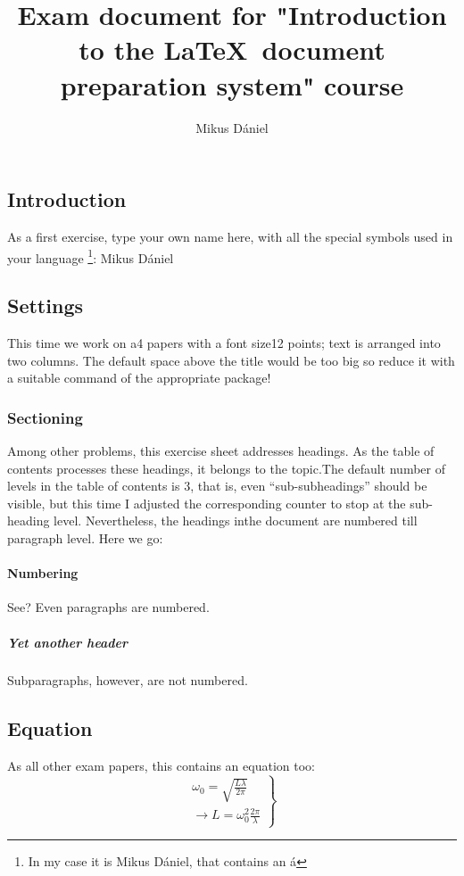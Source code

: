 \documentclass[12pt]{article}
\title{Exam document for "Introduction to the \LaTeX ~document preparation system" course}
\author{Mikus Dániel}
\begin{document}
\maketitle
\begin{multicols}{2}
\section{Introduction}
As a first exercise, type your own name here, with all the special symbols used in your language \footnote{In my case it is Mikus Dániel, that contains an á}: Mikus Dániel
\subsection{Settings}
This time we work on a4 papers with a font size12 points; text is arranged into two columns. The default space above the title would be too big so reduce it with a suitable command of the appropriate package!
\subsubsection{Sectioning}
Among other problems, this exercise sheet addresses headings. As the table of contents processes these headings, it belongs to the topic.The default number of levels in the table of contents is 3, that is, even “sub-subheadings” should be visible, but this time I adjusted the corresponding counter to stop at the sub-heading level.  Nevertheless, the headings inthe document are numbered till paragraph level. Here we go:
\paragraph{Numbering}
See? Even paragraphs are numbered. 
\subparagraph{Yet another header}
Subparagraphs, however, are not numbered. \columnbreak
\subsection{Equation}
As all other exam papers, this contains an equation too:
\begin{equation}
\left.
\begin{array}{c}
   \omega _0 = \sqrt{\frac{L \lambda}{2 \pi}} \\
    \to L = \omega _0^2 \frac{2 \pi}{\lambda}
\end{array}
\right\}
\end{equation}
\tableofcontents
\end{multicols}
\end{document}
